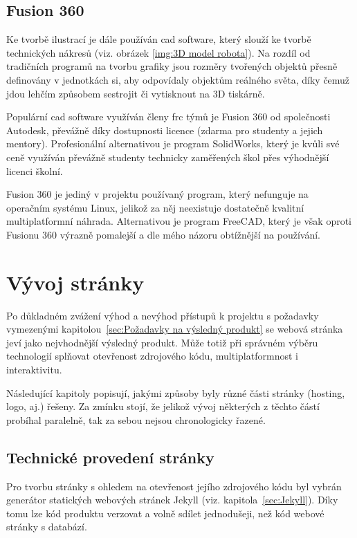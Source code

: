 \documentclass[a4paper, 12pt, twoside]{article}
\begin{document}
  \subsection{Fusion 360} \label{sec:Fusion 360}
  Ke tvorbě ilustrací je dále používán \gls{cad} software, který slouží ke tvorbě technických nákresů (viz. obrázek \ref{img:3D model robota}). Na rozdíl od tradičních programů na tvorbu grafiky jsou rozměry tvořených objektů přesně definovány v jednotkách \gls{si}, aby odpovídaly objektům reálného světa, díky čemuž jdou lehčím způsobem sestrojit či vytisknout na 3D tiskárně.

  Populární \gls{cad} software využíván členy \gls{frc} týmů je Fusion 360 od společnosti Autodesk, převážně díky dostupnosti licence (zdarma pro studenty a jejich mentory). Profesionální alternativou je program SolidWorks, který je kvůli své ceně využíván převážně studenty technicky zaměřených škol přes výhodnější licenci školní.

  Fusion 360 je jediný v projektu používaný program, který nefunguje na operačním systému Linux, jelikož za něj neexistuje dostatečně kvalitní multiplatformní náhrada. Alternativou je program FreeCAD, který je však oproti Fusionu 360 výrazně pomalejší a dle mého názoru obtížnější na používání.


  \section{Vývoj stránky}
  Po důkladném zvážení výhod a nevýhod přístupů k projektu s požadavky vymezenými kapitolou~\ref{sec:Požadavky na výsledný produkt} se webová stránka jeví jako nejvhodnější výsledný produkt. Může totiž při správném výběru technologií splňovat otevřenost zdrojového kódu, multiplatformnost i interaktivitu.

  Následující kapitoly popisují, jakými způsoby byly různé části stránky (hosting, logo, aj.) řešeny. Za zmínku stojí, že jelikož vývoj některých z těchto částí probíhal paralelně, tak za sebou nejsou chronologicky řazené.


  \subsection{Technické provedení stránky}
  Pro tvorbu stránky s ohledem na otevřenost jejího zdrojového kódu byl vybrán generátor statických webových stránek Jekyll (viz. kapitola~\ref{sec:Jekyll}). Díky tomu lze kód produktu verzovat a volně sdílet jednodušeji, než kód webové stránky s databází.
\end{document}
